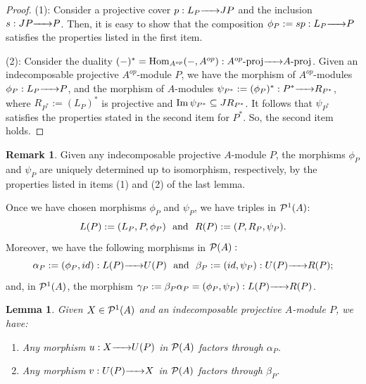 \documentclass{article}
\newtheorem{lemma}[theorem]{Lemma}
\theoremstyle{definition}
\newtheorem{remark}[theorem]{Remark}
\newcommand{\Hom}{{ \rm Hom }}
\newcommand{\proj}{{\rm proj }}
\newcommand{\g}{\hbox{-}}
\renewcommand{\Im}{{\rm Im}\,}
\newcommand{\rightmap}[1]{\smash{\mathop{\hbox to 
20pt{\rightarrowfill}}\limits^{#1}}}
\begin{document}
\begin{proof} (1): Consider a projective cover $p:L_P\rightmap{}JP$ and the inclusion $s:JP\rightmap{}P$. Then, it is easy to show that  the composition $\phi_P:=sp:L_P\rightmap{}P$ satisfies the  properties listed in the first item.  

\noindent(2): Consider the  duality $(-)^*=\Hom_{A^{op}}(-,A^{op}):A^{op}\g\proj\rightmap{}A\g\proj$. Given an indecomposable projective $A^{op}$-module $P$, we have the morphism of $A^{op}$-modules $\phi_P:L_P\rightmap{}P$, and the morphism of $A$-modules $\psi_{P^*}:=(\phi_P)^*:P^*\rightmap{}R_{P^*}$, where $R_{P^*}:=(L_P)^*$ is projective and $\Im \psi_{P^*}\subseteq JR_{P^*}$. It follows that $\psi_{P^*}$ satisfies the properties stated in the second item for $P^*$. So, the second item holds.  
\end{proof}

\begin{remark}\label{N: notation alpa, beta y gamma} Given any indecomposable projective $A$-module $P$, the morphisms $\phi_P$ and $\psi_P$ are uniquely determined up to isomorphism,  respectively, by the properties listed in items (1) and (2) of the last lemma. 

Once we have chosen morphisms $\phi_P$ and $\psi_P$,   we have  triples in ${\cal P}^1(A)$: 
$$L(P):=(L_P,P,\phi_P) \hbox{ \ and \ } R(P):=(P,R_P,\psi_P).$$  
Moreover, we have the  following morphisms in ${\cal P}(A):$
$$ \alpha_P := (\phi_P,id) : L(P)\rightmap{}U(P)\hbox{ \ and \ } \beta_P := (id,\psi_P) : U(P)\rightmap{}R(P);$$
and, in ${\cal P}^1(A)$, the morphism 
$\gamma_P := 
\beta_P\alpha_P= (\phi_P, \psi_P) : L(P)\rightmap{}R(P)$.
\end{remark}

\begin{lemma}\label{L: facts en P1(Lambda)}
Given $X\in {\cal P}^1(A)$ and an indecomposable projective $A$-module $P$, we have:  
\begin{enumerate}
\item Any morphism $u:X\rightmap{}U(P)$ in ${\cal P}(A)$ factors through $\alpha_P$.
\item Any morphism $v:U(P)\rightmap{}X$ in ${\cal P}(A)$ factors through $\beta_P$. 
\end{enumerate}
\end{lemma}
\end{document}
